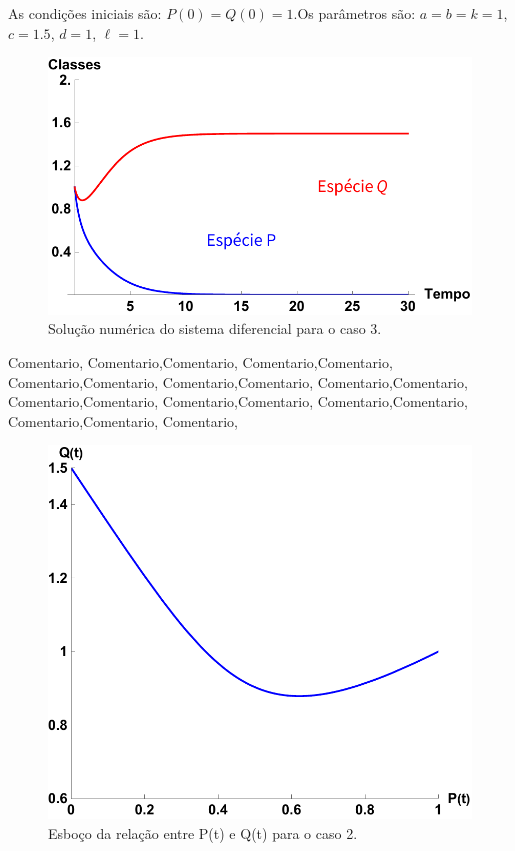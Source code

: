 As condições iniciais são: $P(0)=Q(0)=1$.\newline Os parâmetros são:  $a=b=k=1$, $c=1.5$, $d=1$, $\ell=1$.
\begin{figure}[htbp]
\centering
\includegraphics[keepaspectratio=true,scale=0.75]{caso3_a.pdf}
\caption{Solução numérica do sistema diferencial para o caso 3.}
\label{fig:z}
\end{figure}
\bigskip
\noindent
Comentario, Comentario,Comentario, Comentario,Comentario, Comentario,Comentario, Comentario,Comentario, Comentario,Comentario, Comentario,Comentario, Comentario,Comentario, Comentario,Comentario, Comentario,Comentario, Comentario,
\begin{figure}[htbp]
\centering
\includegraphics[keepaspectratio=true,scale=0.5]{caso3_b.pdf}
\caption{Esboço da relação entre P(t) e Q(t) para o caso 2.}
\label{fig:zz}
\end{figure}
